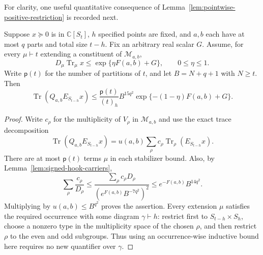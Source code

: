For clarity, one useful quantitative consequence of
Lemma~\ref{lem:pointwise-positive-restriction} is recorded next.
\begin{lemma}\label{s:local-stabilizer-trace}
Suppose $x\succeq0$ is in $\mathbb C[S_t]$, $h$ specified points
are fixed, and $a,b$ each have at most $q$ parts and total size $t-h$.
Fix an arbitrary real scalar $G$. Assume, for every
$\mu\vdash t$ extending a constituent of $\mathcal M_{a,b}$,
\[
 D_\mu\operatorname{Tr}_\mu x
 \le \exp\{\eta F(a,b)+G\},\qquad 0\le\eta\le1.
\]
Write $\mathsf p(t)$ for the number of partitions of $t$, and let
$B=N+q+1$ with $N\ge t$. Then
\begin{equation}
 \operatorname{Tr}(Q_{a,b}E_{S_{t-h}}x)
 \le \frac{\mathsf p(t)}{(t)_h}
    B^{15q^2}\exp\{-(1-\eta)F(a,b)+G\}.
 \label{eq:local-stabilizer-trace-explicit}
\end{equation}
\end{lemma}
\begin{proof}
Write $c_\rho$ for the multiplicity of $V_\rho$ in
$\mathcal M_{a,b}$ and use the exact trace decomposition
\[
 \operatorname{Tr}(Q_{a,b}E_{S_{t-h}}x)
 =u(a,b)\sum_\rho c_\rho
               \operatorname{Tr}_\rho(E_{S_{t-h}}x).
\]
There are at most $\mathsf p(t)$ terms $\mu$ in each stabilizer
bound. Also, by Lemma~\ref{lem:signed-hook-carriers},
\[
 \sum_\rho\frac{c_\rho}{D_\rho}
 \le\frac{\sum_\rho c_\rho D_\rho}
          {(e^{F(a,b)}B^{-7q^2})^2}
 \le e^{-F(a,b)}B^{14q^2}.
\]
Multiplying by $u(a,b)\le B^{q^2}$ proves the assertion. Every
extension $\mu$ satisfies the required occurrence with some
diagram $\gamma\vdash h$: restrict first to
$S_{t-h}\times S_h$, choose a nonzero type in the multiplicity
space of the chosen $\rho$, and then restrict $\rho$ to the even
and odd subgroups. Thus using an occurrence-wise inductive bound
here requires no new quantifier over $\gamma$.
\end{proof}

